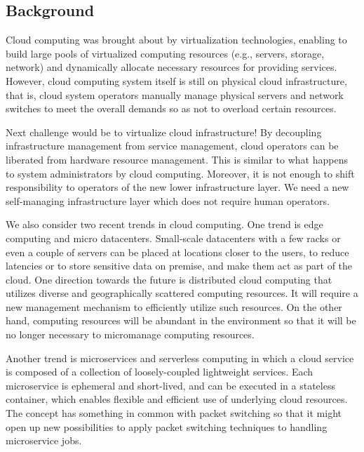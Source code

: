 \subsection{Background}

Cloud computing was brought about by virtualization technologies,
enabling to build large pools of virtualized computing resources (e.g.,
servers, storage, network) and dynamically allocate necessary resources
for providing services.
However, cloud computing system itself is still on physical cloud
infrastructure, that is, cloud system operators manually manage
physical servers and network switches to meet the overall demands
so as not to overload certain resources.

Next challenge would be to virtualize cloud infrastructure!
By decoupling infrastructure management from service management,
cloud operators can be liberated from hardware resource management.
This is similar to what happens to system administrators by cloud
computing.
Moreover, it is not enough to shift responsibility to operators of the
new lower infrastructure layer. We need a new self-managing
infrastructure layer which does not require human operators.

We also consider two recent trends in cloud computing.
One trend is edge computing and micro datacenters.
Small-scale datacenters with a few racks or even a couple of servers
can be placed at locations closer to the users, to reduce latencies
or to store sensitive data on premise, and make them act as part of
the cloud.
One direction towards the future is distributed cloud computing that
utilizes diverse and geographically scattered computing resources.
It will require a new management mechanism to efficiently utilize such
resources.
On the other hand, computing resources will be abundant in the
environment so that it will be no longer necessary to micromanage
computing resources.

Another trend is microservices and serverless computing in which
a cloud service is composed of a collection of loosely-coupled
lightweight services.
Each microservice is ephemeral and short-lived, and can be executed
in a stateless container,
which enables flexible and efficient use of underlying cloud
resources.
The concept has something in common with packet switching so that
it might open up new possibilities to apply packet switching
techniques to handling microservice jobs.

